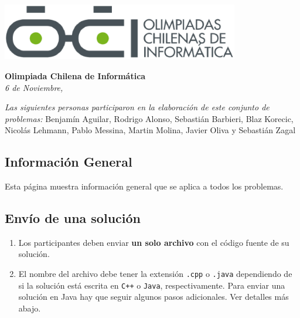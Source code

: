 \documentclass[12pt]{oci}
\begin{document}
  \begin{center}
  \includegraphics[height=70pt]{logo.eps}

  \vskip 70pt
  \Large{\bf Olimpiada Chilena de Inform\'atica\\ \the\year}
  \vskip 10pt
  \large{\phase}
  \vskip 10pt
  \normalsize{\it 6 de Noviembre, \the\year}

  \vskip 85pt


  \emph{Las siguientes personas participaron en la elaboración de este conjunto
    de problemas:}
  \vskip 10pt
  Benjamín Aguilar, Rodrigo Alonso, Sebastián Barbieri,
  \vskip 0.5pt
  Blaz Korecic, Nicolás Lehmann, Pablo Messina,
  \vskip 0.5pt
  Martin Molina, Javier Oliva y Sebastián Zagal
  \end{center}
\cleardoublepage


\subsection*{Información General}

Esta página muestra información general que se aplica a todos los problemas.

\subsection*{Envío de una solución}

\begin{enumerate}
\item Los participantes deben enviar {\bf un solo archivo} con el código fuente de su solución.
\item El nombre del archivo debe tener la extensión \verb+.cpp+ o
  \verb+.java+ dependiendo de si la solución está escrita en
  \verb|C++| o \verb|Java|, respectivamente.
Para enviar una solución en Java hay que seguir algunos pasos adicionales. Ver detalles más abajo.
\end{enumerate}
\end{document}
